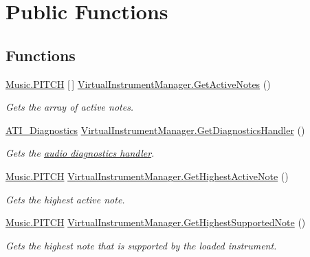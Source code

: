 \hypertarget{group___v_i_m_pub_func}{}\section{Public Functions}
\label{group___v_i_m_pub_func}
\subsection*{Functions}
\begin{DoxyCompactItemize}
\item 
\hyperlink{group___music_enums_ga508f69b199ea518f935486c990edac1d}{Music.\+P\+I\+T\+CH} \mbox{[}$\,$\mbox{]} \hyperlink{group___v_i_m_pub_func_ga119e0c582106fc9ecc2631e39d71d681}{Virtual\+Instrument\+Manager.\+Get\+Active\+Notes} ()
\begin{DoxyCompactList}\small\item\em Gets the array of active notes. \end{DoxyCompactList}\item 
\hyperlink{group___audio_testing_class_a_t_i___diagnostics}{A\+T\+I\+\_\+\+Diagnostics} \hyperlink{group___v_i_m_pub_func_ga7e60bc3c5464d8f34f0d56def675bcc6}{Virtual\+Instrument\+Manager.\+Get\+Diagnostics\+Handler} ()
\begin{DoxyCompactList}\small\item\em Gets the \hyperlink{group___audio_testing_class_a_t_i___diagnostics}{audio diagnostics handler}. \end{DoxyCompactList}\item 
\hyperlink{group___music_enums_ga508f69b199ea518f935486c990edac1d}{Music.\+P\+I\+T\+CH} \hyperlink{group___v_i_m_pub_func_gab58eabfbcdaa60a3a7dbd972df6f57a6}{Virtual\+Instrument\+Manager.\+Get\+Highest\+Active\+Note} ()
\begin{DoxyCompactList}\small\item\em Gets the highest active note. \end{DoxyCompactList}\item 
\hyperlink{group___music_enums_ga508f69b199ea518f935486c990edac1d}{Music.\+P\+I\+T\+CH} \hyperlink{group___v_i_m_pub_func_ga586d5ed5b0fe832d66c9a99aa160ceee}{Virtual\+Instrument\+Manager.\+Get\+Highest\+Supported\+Note} ()
\begin{DoxyCompactList}\small\item\em Gets the highest note that is supported by the loaded instrument. \end{DoxyCompactList}\item 

\end{DoxyCompactItemize}
